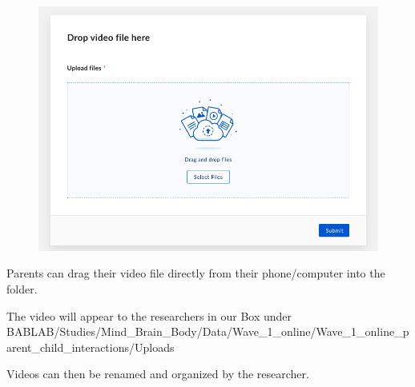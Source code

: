 \documentclass[]{book}
\begin{document}
\begin{figure}
\centering
\includegraphics{images/zoom_parent_child_interaction/13.png}
\caption{}
\end{figure}

Parents can drag their video file directly from their phone/computer into the folder.

The video will appear to the researchers in our Box under BABLAB/Studies/Mind\_Brain\_Body/Data/Wave\_1\_online/Wave\_1\_online\_parent\_child\_interactions/Uploads

Videos can then be renamed and organized by the researcher.


\end{document}
